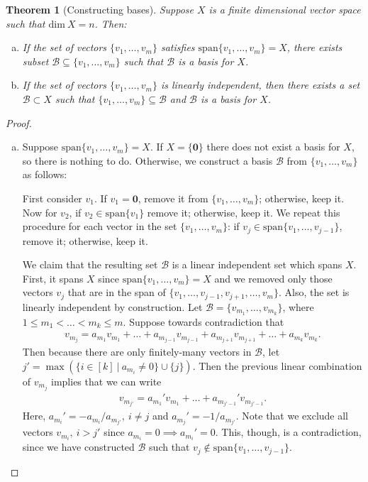 \documentclass[11pt]{article}
\theoremstyle{mystyle}
\newtheorem{thm}{Theorem}[section]
\newcommand{\0}{\mathbf{0}}
\begin{document}
\begin{thm}[Constructing bases]\label{constructbasis}
Suppose $X$ is a finite dimensional vector space such that $\text{dim} \ X = n$. Then:
\begin{enumerate}[(a)]
    \item If the set of vectors $\{v_1, \ldots, v_m\}$ satisfies $\text{span}\{v_1, \ldots, v_m\} = X$, there exists subset $\mathcal{B} \subseteq \{v_1, \ldots, v_m\}$ such that $\mathcal{B}$ is a basis for $X$.
    \item If the set of vectors $\{v_1, \ldots, v_m\}$ is linearly independent, then there exists a set $\mathcal{B} \subset X$ such that $\{v_1, \ldots, v_m\} \subseteq \mathcal{B}$ and $\mathcal{B}$ is a basis for $X$.
\end{enumerate}
\end{thm}
\begin{proof}
\begin{enumerate}[(a)]
    \item Suppose $\text{span}\{v_1, \ldots, v_m\} = X$. If $X = \{\0\}$ there does not exist a basis for $X$, so there is nothing to do. Otherwise, we construct a basis $\mathcal{B}$ from $\{v_1, \ldots, v_m\}$ as follows:
    
    First consider $v_1$. If $v_1 = \0$, remove it from $\{v_1, \ldots, v_m\}$; otherwise, keep it. Now for $v_2$, if $v_2 \in \text{span}\{v_1\}$ remove it; otherwise, keep it. We repeat this procedure for each vector in the set $\{v_1, \ldots, v_m\}$: if $v_j \in \text{span}\{v_1, \ldots, v_{j-1}\}$, remove it; otherwise, keep it.
    
    We claim that the resulting set $\mathcal{B}$ is a linear independent set which spans $X$. First, it spans $X$ since $\text{span}\{v_1, \ldots, v_m\} = X$ and we removed only those vectors $v_j$ that are in the span of $\{v_1, \ldots, v_{j-1}, v_{j+1}, \ldots, v_m\}$. Also, the set is linearly independent by construction. Let $\mathcal{B} = \{v_{m_1}, \ldots, v_{m_k}\}$, where $1 \leq m_1 < \ldots < m_k \leq m$. Suppose towards contradiction that
    \begin{align*}
    v_{m_j} = a_{m_1}v_{m_1} + \ldots +  a_{m_{j-1}}v_{m_{j-1}} + a_{m_{j+1}}v_{m_{j+1}} + \ldots + a_{m_k}v_{m_k}.
    \end{align*}
    Then because there are only finitely-many vectors in $\mathcal{B}$, let $j' = \max( \{ i \in [k] \ | \ a_{m_i} \neq 0 \}\cup\{j\})$. Then the previous linear combination of $v_{m_j}$ implies that we can write
    \begin{align*}
    v_{m_{j'}} = a_{m_1}'v_{m_1} + \ldots +  a_{m_{j'-1}}'v_{m_{j'-1}}.
    \end{align*}
    Here, $a_{m_i}' = -a_{m_i}/a_{m_{j'}}, \ i \neq j$ and $a_{m_j}' = -1/a_{m_{j'}}$. Note that we exclude all vectors $v_{m_i}, \ i > j'$ since $a_{m_i} = 0 \implies a_{m_i}' = 0$. This, though, is a contradiction, since we have constructed $\mathcal{B}$ such that $v_j \notin \text{span}\{v_1, \ldots, v_{j-1}\}$.
    

\end{enumerate}
\end{proof}
\end{document}
